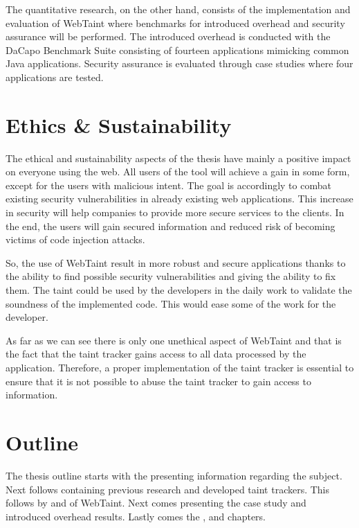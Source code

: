The quantitative research, on the other hand, consists of the implementation and evaluation of WebTaint where benchmarks for introduced overhead and security assurance will be performed. The introduced overhead is conducted with the DaCapo Benchmark Suite \parencite{dacapo} consisting of fourteen applications mimicking common Java applications. Security assurance is evaluated through case studies where four applications are tested.



\section{Ethics \& Sustainability}
\label{Ethics}
The ethical and sustainability aspects of the thesis have mainly a positive impact on everyone using the web. All users of the tool will achieve a gain in some form, except for the users with malicious intent. The goal is accordingly to combat existing security vulnerabilities in already existing web applications. This increase in security will help companies to provide more secure services to the clients. In the end, the users will gain secured information and reduced risk of becoming victims of code injection attacks.

So, the use of WebTaint result in more robust and secure applications thanks to the ability to find possible security vulnerabilities and giving the ability to fix them. The taint could be used by the developers in the daily work to validate the soundness of the implemented code. This would ease some of the work for the developer.

As far as we can see there is only one unethical aspect of WebTaint and that is the fact that the taint tracker gains access to all data processed by the application. Therefore, a proper implementation of the taint tracker is essential to ensure that it is not possible to abuse the taint tracker to gain access to information.



\section{Outline}
\label{Outline}
The thesis outline starts with the \textit{} presenting information regarding the subject. Next follows \textit{} containing previous research and developed taint trackers. This follows by \textit{} and \textit{} of WebTaint. Next comes \textit{} presenting the case study and introduced overhead results. Lastly comes the \textit{}, \textit{} and \textit{} chapters.
